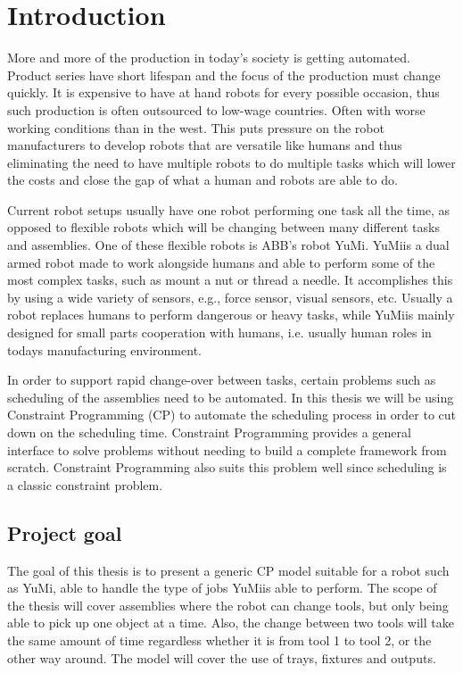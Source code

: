 \chapter{Introduction} 

More and more of the production in today's society is getting automated.
Product series have short lifespan and the focus of the production must change quickly. It is expensive to have at hand robots for every possible occasion, thus such production is often outsourced to low-wage countries. Often with worse working conditions than in the west. This puts pressure on the robot manufacturers to develop robots that are versatile like humans and thus eliminating the need to have multiple robots to do multiple tasks which will lower the costs and close the gap of what a human and robots are able to do.

Current robot setups usually have one robot performing one task all the time, as opposed to flexible robots which will be changing between many different tasks and assemblies. One of these flexible robots is ABB's robot YuMi\textsuperscript\textregistered. YuMi\textsuperscript\textregistered is a dual armed robot made to work alongside humans and able to perform some of the most complex tasks, such as mount a nut or thread a needle\cite{_yumi_}. It accomplishes this by using a wide variety of sensors, e.g., force sensor, visual sensors, etc. Usually a robot replaces humans to perform dangerous or heavy tasks, while YuMi\textsuperscript\textregistered is mainly designed for small parts cooperation with humans, i.e. usually human roles in todays manufacturing environment.

In order to support rapid change-over between tasks, certain problems such as scheduling of the assemblies need to be automated. In this thesis we will be using Constraint Programming (CP) to automate the scheduling process in order to cut down on the scheduling time. Constraint Programming provides a general interface to solve problems without needing to build a complete framework from scratch. Constraint Programming also suits this problem well since scheduling is a classic constraint problem.

\newpage

\section{Project goal}
The goal of this thesis is to present a generic CP model suitable for a robot such as YuMi\textsuperscript\textregistered, able to handle the type of jobs YuMi\textsuperscript\textregistered is able to perform. The scope of the thesis will cover assemblies where the robot can change tools, but only being able to pick up one object at a time. Also, the change between two tools will take the same amount of time regardless whether it is from tool 1 to tool 2, or the other way around. The model will cover the use of trays, fixtures and outputs.

